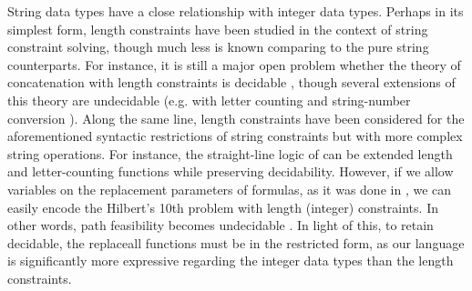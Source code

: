 
 
String data types have a close relationship with integer data types. Perhaps in its simplest form, 
length constraints have been  studied in the context of string constraint solving, though much less is known comparing to the pure string counterparts. For instance, it is still a major open problem whether the theory of concatenation with length constraints is decidable \cite{Vijay-length}, though  several extensions of this 
theory are undecidable (e.g. with letter counting \cite{buchi} and
string-number conversion \cite{GB16}). 
%
Along the same line, length constraints have been considered for the  aforementioned syntactic restrictions of string constraints but with more complex string operations. For instance, the straight-line logic of \cite{LB16} can be extended length and letter-counting functions while preserving decidability. However,  %
if we allow variables on the replacement parameters of formulas, as it was done in \cite{CHL+18}, %
we can easily encode the Hilbert's 10th problem with length (integer) 
constraints. In other words, path feasibility becomes undecidable \cite{CCH+18}. In light of this, to retain decidable,  the replaceall functions must be in the restricted form, as our language is significantly more expressive regarding the integer data types than the length constraints. 
%


